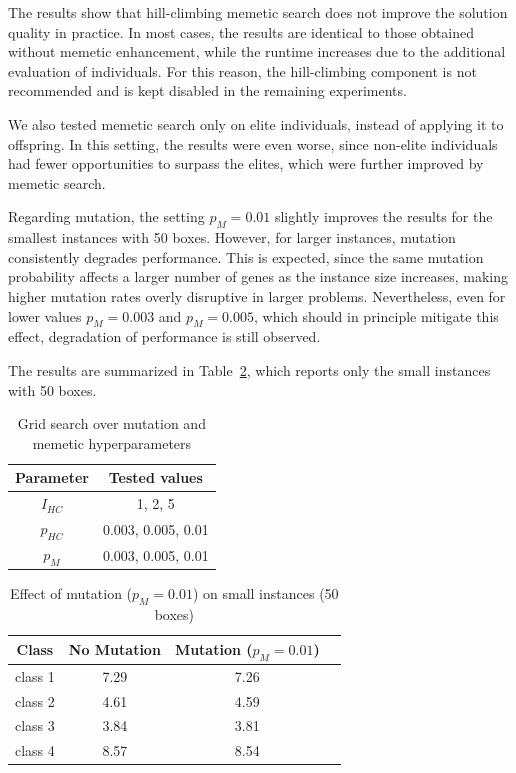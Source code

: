 The results show that hill-climbing memetic search does not improve the solution quality in practice. 
In most cases, the results are identical to those obtained without memetic enhancement, 
while the runtime increases due to the additional evaluation of individuals. 
For this reason, the hill-climbing component is not recommended and is kept disabled in the remaining experiments.

We also tested memetic search only on elite individuals, instead of applying it to offspring. 
In this setting, the results were even worse, since non-elite individuals had fewer opportunities 
to surpass the elites, which were further improved by memetic search.

Regarding mutation, the setting $p_M = 0.01$ slightly improves the results for the smallest instances with 50 boxes. 
However, for larger instances, mutation consistently degrades performance. 
This is expected, since the same mutation probability affects a larger number of genes as the instance size increases, making higher mutation rates overly disruptive in larger problems. 
Nevertheless, even for lower values $p_M = 0.003$ and $p_M = 0.005$, which should in principle mitigate this effect, degradation of performance is still observed.

The results are summarized in Table~\ref{tab:mutation-results}, which reports only the small instances with 50 boxes.

\begin{table}[htbp]
\centering
\caption{Grid search over mutation and memetic hyperparameters}
\label{tab:mutation-memetic-parameters}
\begin{tabular}{|c|c|}
\hline
Parameter & Tested values \\ \hline
$I_{HC}$ & 1, 2, 5 \\ \hline
$p_{HC}$ & 0.003, 0.005, 0.01 \\ \hline
$p_M$ & 0.003, 0.005, 0.01 \\ \hline
\end{tabular}
\end{table}

\begin{table}[htbp]
\centering
\caption{Effect of mutation ($p_M = 0.01$) on small instances (50 boxes)}
\label{tab:mutation-results}
\begin{tabular}{|c|c|c|c|}
\hline
Class & No Mutation & Mutation ($p_M = 0.01$) \\ \hline
class 1 & 7.29 & 7.26 \\ \hline
class 2 & 4.61 & 4.59 \\ \hline
class 3 & 3.84 & 3.81 \\ \hline
class 4 & 8.57 & 8.54 \\ \hline
\end{tabular}
\end{table}

